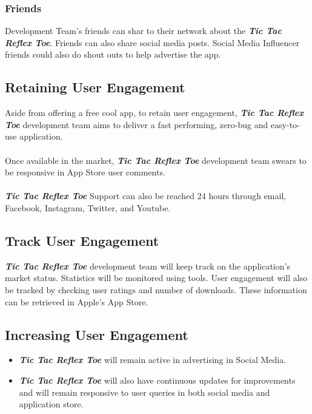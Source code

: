 \documentclass{scrartcl}
\begin{document}
    \subsubsection{Friends}
        Development Team's friends can shar to their network about the \textbf{\emph{Tic Tac Reflex Toe}}. Friends can also share social media posts.  Social Media Influencer friends could also do shout outs to help advertise the app.
    ~\newline
\subsection{Retaining User Engagement}
    Aside from offering a free cool app, to retain user engagement, \textbf{\emph{Tic Tac Reflex Toe}} development team aims to deliver a fast performing, zero-bug and easy-to-use application.\\\\
    Once available in the market, \textbf{\emph{Tic Tac Reflex Toe}} development team swears to be responsive in  App Store user comments.\\\\
    \textbf{\emph{Tic Tac Reflex Toe}} Support can also be reached 24 hours through email, Facebook, Instagram, Twitter, and Youtube.
    ~\newline

\subsection{Track User Engagement}
    \textbf{\emph{Tic Tac Reflex Toe}} development team will keep track on the application's market status.  Statistics will be monitored using tools.  User engagement will also be tracked by 
    checking user ratings and number of downloads.  These information can be retrieved in Apple’s App Store.  
    ~\newline
\subsection{Increasing User Engagement}
    \begin{itemize}
        \item \textbf{\emph{Tic Tac Reflex Toe}} will remain active in advertising in Social Media.
        \item \textbf{\emph{Tic Tac Reflex Toe}} will also have continuous updates for improvements and will remain responsive to user queries in both social media and application store.
    \end{itemize}
    
\end{document}
